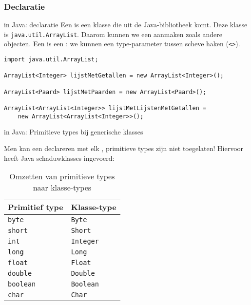 \subsubsection{Declaratie}
\begin{frame}[fragile]{\dsarraylist{} in Java: declaratie}
Een \dsarraylist{} is een klasse die uit de Java-bibliotheek komt. Deze klasse is \texttt{java.util.ArrayList}. Daarom kunnen we een \dsarraylist{} aanmaken zoals andere objecten. Een \dsarraylist{} is een : we kunnen een type-parameter tussen scheve haken (\texttt{<>}).
\begin{example}
\begin{lstlisting}
import java.util.ArrayList;

ArrayList<Integer> lijstMetGetallen = new ArrayList<Integer>();

ArrayList<Paard> lijstMetPaarden = new ArrayList<Paard>();

ArrayList<ArrayList<Integer>> lijstMetLijstenMetGetallen =
    new ArrayList<ArrayList<Integer>>();
\end{lstlisting}
\end{example}
\end{frame}
\begin{frame}[fragile]{\dsarraylist{} in Java: Primitieve types bij generische klasses}
\begin{letop}
\small{Men kan een \dsarraylist{} declareren met elk , primitieve types zijn niet toegelaten! Hiervoor heeft Java schaduwklasses ingevoerd:}
\begin{table}
\centering
\small{\begin{tabular}{l|l}
Primitief type&Klasse-type\\\hline
\texttt{byte}&\texttt{Byte}\\
\texttt{short}&\texttt{Short}\\
\texttt{int}&\texttt{Integer}\\
\texttt{long}&\texttt{Long}\\
\texttt{float}&\texttt{Float}\\
\texttt{double}&\texttt{Double}\\
\texttt{boolean}&\texttt{Boolean}\\
\texttt{char}&\texttt{Char}\\
\end{tabular}}
\caption{Omzetten van primitieve types naar klasse-types}
\end{table}
\end{letop}
\end{frame}
